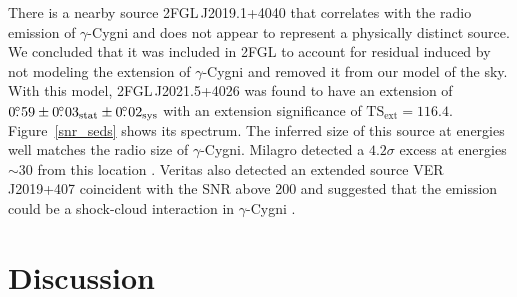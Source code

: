 \documentclass[12pt,preprint]{aastex}
\newcommand{\gev}{\text{GeV}\xspace}
\newcommand{\tev}{\text{TeV}\xspace}
\newcommand{\tsext}{{\ensuremath{\text{TS}_{\text{ext}}}}\xspace}
\newcommand{\sys}{\text{sys}\xspace}
\newcommand{\stat}{\text{stat}\xspace}
\begin{document}
There is a nearby source 2FGL\,J2019.1+4040 that correlates with the radio
emission of $\gamma$-Cygni and does not appear to represent a physically
distinct source.  We concluded that it was included in 2FGL to account
for residual induced by not modeling the extension of $\gamma$-Cygni and
removed it from our model of the sky.  With this model, 2FGL\,J2021.5+4026
was found to have an extension of $0\fdg59\pm0\fdg03_\stat\pm0\fdg02_\sys$
with an extension significance of $\tsext=116.4$.  Figure~\ref{snr_seds}
shows its spectrum.  The inferred size of this source at \gev energies
well matches the radio size of $\gamma$-Cygni.  Milagro detected
a $4.2\sigma$ excess at energies $\sim 30$ \tev from this location
\citep{lat_bsl,milagro_bright_source_list}.  Veritas also detected an
extended source VER\,J2019+407 coincident with the SNR above 200 \gev
and suggested that the \tev emission could be a shock-cloud interaction
in $\gamma$-Cygni \citep{veritas_gamma_cygni}.






\section{Discussion}
\end{document}
